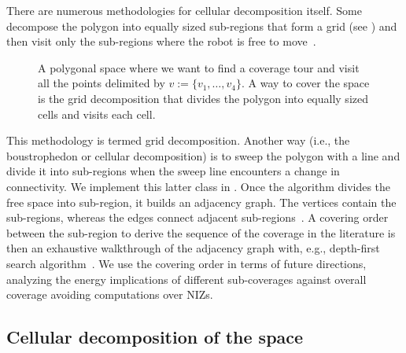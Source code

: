 There are numerous methodologies for cellular decomposition itself. Some decompose the polygon into equally sized sub-regions that form a grid (see ) and then visit only the sub-regions where the robot is free to move~\citep{galceran2013survey}. 
\begin{figure}[h!]
  \centering
  \selectfont
  
  \caption[Grid decomposition]{A polygonal space where we want to find a coverage tour and visit all the points delimited by $v:=\{v_1,\dots,v_4\}$. A way to cover the space is the grid decomposition that divides the polygon into equally sized cells and visits each cell.}
  \label{fig:gride}
\end{figure}
This methodology is termed grid decomposition. Another way (i.e., the boustrophedon or cellular decomposition) is to sweep the polygon with a line and divide it into sub-regions when the sweep line encounters a change in connectivity. We implement this latter class in . Once the algorithm divides the free space into sub-region, it builds an adjacency graph. The vertices contain the sub-regions, whereas the edges connect adjacent sub-regions~\citep{choset2005principles}. A covering order between the sub-region to derive the sequence of the coverage in the literature is then an exhaustive walkthrough of the adjacency graph with, e.g., depth-first search algorithm~\citep{choset2005principles}. We use the covering order in terms of future directions, analyzing the energy implications of different sub-coverages against overall coverage avoiding computations over NIZs.

\subsection{Cellular decomposition of the space}
\label{sec:cell-deco}

